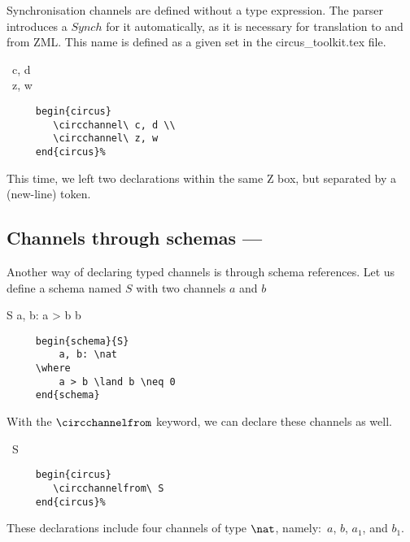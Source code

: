 \documentclass{article}
\begin{document}
Synchronisation channels are defined without a type expression. The parser
introduces a $Synch$  for it automatically, as it is necessary
for translation to and from ZML. This name is defined as a given set in the
\textsf{circus\_toolkit.tex} file.
%
\begin{circus}
   \circchannel\ c, d \\
   \circchannel\ z, w
\end{circus}%
%
\begin{verbatim}
     begin{circus}
        \circchannel\ c, d \\
        \circchannel\ z, w
     end{circus}%
\end{verbatim}
%
This time, we left two declarations within the same Z box, but separated by a
 (new-line) token.

%
%

\subsection{Channels through schemas --- }

Another way of declaring typed channels is through schema references. Let us
define a schema named $S$ with two channels $a$ and $b$
%
\begin{schema}{S}
   a, b: \nat
\where
   a > b \land b 
\end{schema}
%
\begin{verbatim}
     begin{schema}{S}
         a, b: \nat
     \where
         a > b \land b \neq 0
     end{schema}
\end{verbatim}
%
With the $\circchannelfrom$ keyword, we can declare these channels as well.
%
\begin{circus}
   \circchannelfrom\ S 
\end{circus}%
%
\begin{verbatim}
     begin{circus}
        \circchannelfrom\ S 
     end{circus}%
\end{verbatim}
%
These declarations include four channels of type $\nat$, namely:~$a$, $b$,
$a_1$, and $b_1$.
\end{document}
